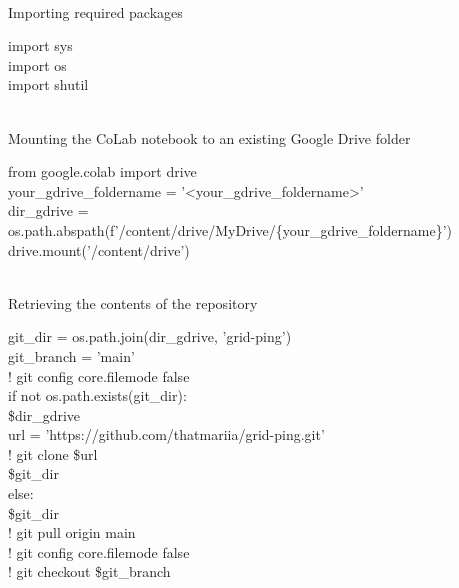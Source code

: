\vspace{\baselineskip}
\thickhline
\\Importing required packages
\normalhline
\vspace{\baselineskip}
{ \codefont \scriptsize \raggedright
    {\color{color-three}import} sys \\
    {\color{color-three}import} os \\
    {\color{color-three}import} shutil \\
}
\vspace{\baselineskip}
\normalhline
\\Mounting the CoLab notebook to an existing Google Drive folder
\normalhline
\vspace{\baselineskip}
{ \codefont \scriptsize \raggedright
    {\color{color-three}from} google.colab {\color{color-three}import} drive \\
    your\_gdrive\_foldername = {\color{color-one}'<your\_gdrive\_foldername>'} \\
    dir\_gdrive = os.path.abspath({\color{color-two}f}{\color{color-one}'/content/drive/MyDrive/}\{your\_gdrive\_foldername\}{\color{color-one}'}) \\
    drive.mount({\color{color-one}'/content/drive'}) \\
}
\vspace{\baselineskip}
\normalhline
\\Retrieving the contents of the repository
\normalhline
\vspace{\baselineskip}
{ \codefont \scriptsize \raggedright
    git\_dir = os.path.join(dir\_gdrive, {\color{color-one}'grid-ping'}) \\
    git\_branch = {\color{color-one}'main'} \\
    \vspace{\baselineskip}
    {\color{color-two}!} git config core.filemode false \\
    \vspace{\baselineskip}
    {\color{color-three}if} {\color{color-two}not} os.path.exists(git\_dir): \\
       \$dir\_gdrive \\
      \qquad url = {\color{color-one}'https://github.com/thatmariia/grid-ping.git'} \\
      \qquad ! git clone \$url \\
       \$git\_dir \\
    {\color{color-three}else}: \\
       \$git\_dir \\
      \qquad ! git pull origin main \\
    \vspace{\baselineskip}
    {\color{color-two}!} git config core.filemode false \\
    {\color{color-two}!} git checkout \$git\_branch \\
}
